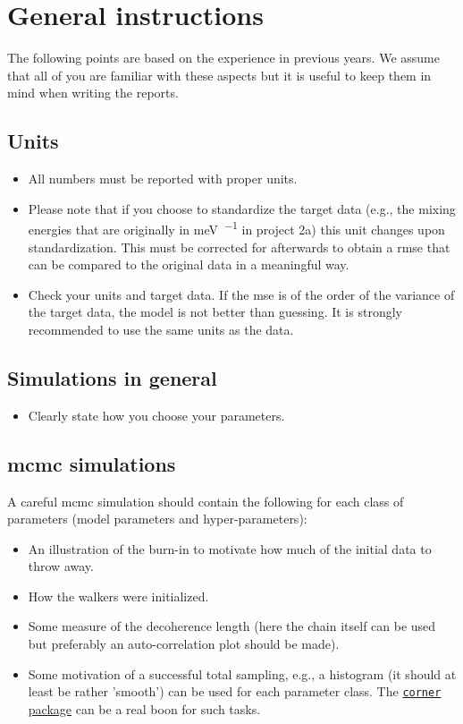 \documentclass[12pt,a4paper]{article}
\begin{document}
\section{General instructions}

The following points are based on the experience in previous years.
We assume that all of you are familiar with these aspects but it is useful to keep them in mind when writing the reports.

\subsection{Units}

\begin{itemize}
\item 
    All numbers must be reported with proper units.
\item 
    Please note that if you choose to standardize the target data (e.g., the mixing energies that are originally in \si{\milli\electronvolt\per\atom} in project 2a) this unit changes upon standardization.
    This must be corrected for afterwards to obtain a \gls{rmse} that can be compared to the original data in a meaningful way.
\item 
    Check your units and target data.
    If the \gls{mse} is of the order of the variance of the target data, the model is not better than guessing.
    It is strongly recommended to use the same units as the data.
\end{itemize}

\subsection{Simulations in general}

\begin{itemize}
\item 
    Clearly state how you choose your parameters.
\end{itemize}

\subsection{\texorpdfstring{\gls{mcmc}}{MCMC} simulations}

A careful \gls{mcmc} simulation should contain the following for each class of parameters (model parameters and hyper-parameters):
\begin{itemize}
\item
    An illustration of the burn-in to motivate how much of the initial data to throw away.
\item
    How the walkers were initialized.
\item
    Some measure of the decoherence length (here the chain itself can be used but preferably an auto-correlation plot should be made).
\item
    Some motivation of a successful total sampling, e.g., a histogram (it should at least be rather 'smooth') can be used for each parameter class.
    The \href{https://corner.readthedocs.io/}{\texttt{corner} package} can be a real boon for such tasks.
\end{itemize}
\end{document}
